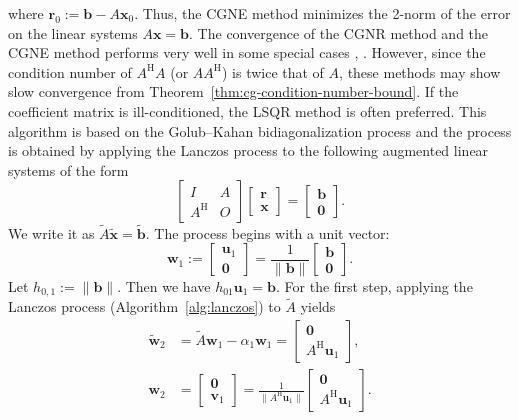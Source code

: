 {where $\bm r_0:=\bm b-A\bm x_0$. Thus, the CGNE method minimizes the 2-norm of the error on the linear systems $A\bm x=\bm b$.}
{The convergence of the CGNR method and the CGNE method performs very well in some special cases , . However, since the condition number of $A^{\mathrm H}A$ (or $AA^{\mathrm H}$) is twice that of $A$, these methods may show slow convergence from Theorem\ \ref{thm:cg-condition-number-bound}.}
{If the coefficient matrix is ill-conditioned, the LSQR method  is often preferred. This algorithm is based on the Golub--Kahan bidiagonalization process  and the process is obtained by applying the Lanczos process to the following augmented linear systems of the form}
\[\begin{bmatrix}I&A\\A^{\mathrm H}&O\end{bmatrix}\begin{bmatrix}\bm r\\\bm x\end{bmatrix}=\begin{bmatrix}\bm b\\\bm0\end{bmatrix}.\]
{We write it as $\widetilde A\widetilde{\bm x}=\widetilde{\bm b}$. The process begins with a unit vector:}
\[\bm w_1:=\begin{bmatrix}\bm u_1\\\bm0\end{bmatrix}=\frac1{\|\bm b\|}\begin{bmatrix}\bm b\\\bm0\end{bmatrix}.\]
{Let $h_{0,1}:=\|\bm b\|$. Then we have $h_{01}\bm u_1=\bm b$. For the first step, applying the Lanczos process (Algorithm\ \ref{alg:lanczos}) to $\widetilde A$ yields}
\[\begin{aligned}\widetilde{\bm w}_2&=\widetilde A\bm w_1-\alpha_1\bm w_1=\begin{bmatrix}\bm0\\A^{\mathrm H}\bm u_1\end{bmatrix},\\
\bm w_2&=\begin{bmatrix}\bm0\\\bm v_1\end{bmatrix}=\frac1{\|A^{\mathrm H}\bm u_1\|}\begin{bmatrix}\bm0\\A^{\mathrm H}\bm u_1\end{bmatrix}.\end{aligned}\]
